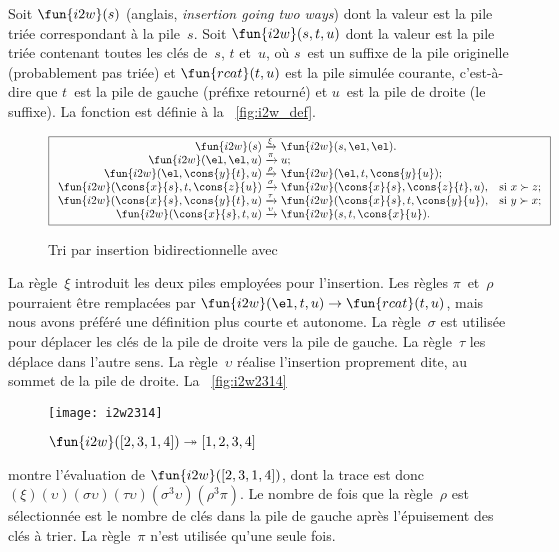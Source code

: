 Soit \(\fun{i2w}(s)\) (anglais, \emph{insertion
  going two ways}) dont la valeur est la pile triée correspondant à la
pile~\(s\). Soit \(\fun{i2w}(s,t,u)\) dont la
valeur est la pile triée contenant toutes les clés de~\(s\), \(t\)
et~\(u\), où \(s\)~est un suffixe de la pile originelle (probablement
pas triée) et \(\fun{rcat}(t,u)\) est la pile
simulée courante, c'est-à-dire que \(t\)~est la pile de gauche
(préfixe retourné) et \(u\)~est la pile de droite (le suffixe). La
fonction  est définie à la
\fig~\vref{fig:i2w_def}.
\begin{figure}[b]
\begin{equation*}
\boxed{%
\begin{array}{r@{\;}l@{\;}ll}
\fun{i2w}(s)         & \xrightarrow{\smash{\xi}}
                     & \fun{i2w}(s,\el,\el).\\
\fun{i2w}(\el,\el,u) & \xrightarrow{\smash{\pi}}
                     & u;\\
\fun{i2w}(\el,\cons{y}{t},u)
                     & \xrightarrow{\smash{\rho}}
                     & \fun{i2w}(\el,t,\cons{y}{u});\\
\fun{i2w}(\cons{x}{s},t,\cons{z}{u})
                     & \xrightarrow{\smash{\sigma}}
                     & \fun{i2w}(\cons{x}{s},\cons{z}{t},u),
                     & \text{si \(x \succ z\)};\\
\fun{i2w}(\cons{x}{s},\cons{y}{t},u)
                     & \xrightarrow{\smash{\tau}}
                     & \fun{i2w}(\cons{x}{s},t,\cons{y}{u}),
                     & \text{si \(y \succ x\)};\\
\fun{i2w}(\cons{x}{s},t,u)
                     & \xrightarrow{\smash{\upsilon}}
                     & \fun{i2w}(s,t,\cons{x}{u}).
\end{array}}
\end{equation*}
\caption{Tri par insertion bidirectionnelle avec 
\label{fig:i2w_def}}
\end{figure}
La règle~\(\xi\) introduit les deux piles employées pour
l'insertion. Les règles \(\pi\)~et~\(\rho\) pourraient être remplacées
par \(\fun{i2w}(\el,t,u) \rightarrow \fun{rcat}(t,u)\), mais nous
avons préféré une définition plus courte et autonome. La
règle~\(\sigma\) est utilisée pour déplacer les clés de la pile de
droite vers la pile de gauche. La règle~\(\tau\) les déplace dans
l'autre sens. La règle~\(\upsilon\) réalise l'insertion proprement
dite, au sommet de la pile de droite. La \fig~\vref{fig:i2w2314}
\begin{figure}
\centering
\texttt{[image: i2w2314]}
\caption{\(\fun{i2w}([2,3,1,4]) \twoheadrightarrow [1,2,3,4]\)
\label{fig:i2w2314}}
\end{figure}
montre l'évaluation  de
\(\fun{i2w}([2,3,1,4])\), dont la trace est donc
\((\xi)(\upsilon)(\sigma\upsilon)
(\tau\upsilon)(\sigma^3\upsilon)(\rho^3\pi)\). Le nombre de fois que
la règle~\(\rho\) est sélectionnée est le nombre de clés dans la pile
de gauche après l'épuisement des clés à trier. La règle~\(\pi\) n'est
utilisée qu'une seule fois.

